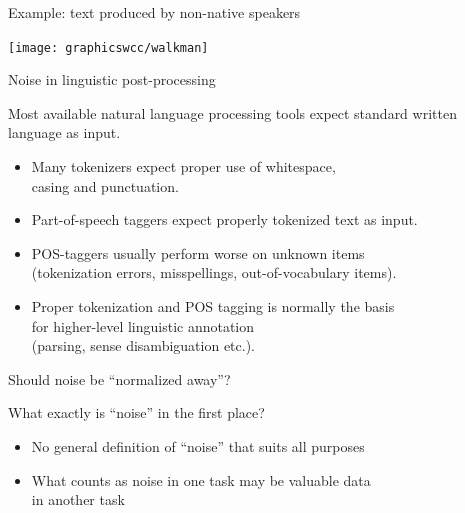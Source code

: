 

\begin{frame}{Example: text produced by non-native speakers}
\begin{center}
     \texttt{[image: graphicswcc/walkman]}\\
   \end{center}
\end{frame}



\begin{frame}
{Noise in linguistic post-processing}

Most available natural language processing tools expect standard written language as input.

\begin{itemize}
\item Many tokenizers expect proper use of whitespace,\\
  casing and punctuation.
\item Part-of-speech taggers expect properly tokenized text as input.
\item POS-taggers usually perform worse on unknown items\\
     (tokenization errors, misspellings, out-of-vocabulary items).
\item Proper tokenization and POS tagging is normally the basis\\
  for higher-level linguistic annotation\\
  (parsing, sense disambiguation etc.).
\end{itemize}
\end{frame}



\begin{frame}
{Should noise be ``normalized away''?}

What exactly is ``noise'' in the first place?

\begin{itemize}
\item No general definition of ``noise'' that suits all purposes
\item What counts as noise in one task may be valuable data\\
  in another task
\end{itemize}
\end{frame}


